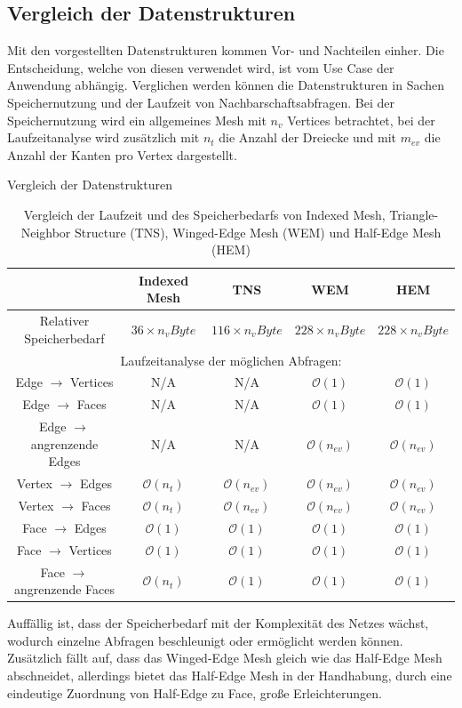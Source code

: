 \subsection{Vergleich der Datenstrukturen}
Mit den vorgestellten Datenstrukturen kommen Vor- und Nachteilen einher. Die Entscheidung, welche von diesen verwendet wird, ist vom Use Case der Anwendung abh\"angig. Verglichen werden k\"onnen die Datenstrukturen in Sachen Speichernutzung und der Laufzeit von Nachbarschaftsabfragen. Bei der Speichernutzung wird ein allgemeines Mesh mit $n_v$ Vertices betrachtet, bei der Laufzeitanalyse wird zus\"atzlich mit $n_t$ die Anzahl der Dreiecke und mit $m_{ev}$ die Anzahl der Kanten pro Vertex dargestellt.

\begin{table}[ht]
	\caption{Vergleich der Datenstrukturen}
	\centering
		\begin{tabular}{|c|c|c|c|c|}
			\hline \rowcolor{gray}
		& Indexed Mesh & TNS & WEM & HEM \\ 
		\hline 
		Relativer Speicherbedarf & $36 \times n_v Byte$ & $116 \times n_v Byte$ & $228 \times n_v Byte$ & $228 \times n_v  Byte$ \\ 
		\hline 
		\multicolumn{5}{|c|}{Laufzeitanalyse der m\"oglichen Abfragen:} \\ 
		\hline 
		Edge $\rightarrow$ Vertices & N/A  & N/A & $\mathcal{O}(1)$ & $\mathcal{O}(1)$  \\ 
		\hline 
		Edge $\rightarrow$ Faces & N/A & N/A & $\mathcal{O}(1)$ & $\mathcal{O}(1)$ \\ 
		\hline 
		Edge $\rightarrow$ angrenzende Edges & N/A & N/A & $\mathcal{O}(n_{ev})$ & $\mathcal{O}(n_{ev})$ \\ 
		\hline 
		Vertex $\rightarrow$ Edges & $\mathcal{O}(n_t)$ & $\mathcal{O}(n_{ev})$ & $\mathcal{O}(n_{ev})$ & $\mathcal{O}(n_{ev})$ \\ 
		\hline 
		Vertex $\rightarrow$ Faces & $\mathcal{O}(n_t)$ & $\mathcal{O}(n_{ev})$ & $\mathcal{O}(n_{ev})$ & $\mathcal{O}(n_{ev})$ \\ 
		\hline 
		Face $\rightarrow$ Edges & $\mathcal{O}(1)$ & $\mathcal{O}(1)$ & $\mathcal{O}(1)$ & $\mathcal{O}(1)$ \\ 
		\hline 
		Face $\rightarrow$ Vertices & $\mathcal{O}(1)$ & $\mathcal{O}(1)$ & $\mathcal{O}(1)$ & $\mathcal{O}(1)$ \\ 
		\hline 
		Face $\rightarrow$ angrenzende Faces & $\mathcal{O}(n_t)$ & $\mathcal{O}(1)$ & $\mathcal{O}(1)$ & $\mathcal{O}(1)$ \\ 
		\hline 
	\end{tabular} 
	\caption{\label{Table:Comp}Vergleich der Laufzeit und des Speicherbedarfs von Indexed Mesh, Triangle-Neighbor Structure (TNS), Winged-Edge Mesh (WEM) und Half-Edge Mesh (HEM)}
\end{table}
Auff\"allig ist, dass der Speicherbedarf mit der Komplexit\"at des Netzes w\"achst, wodurch einzelne Abfragen beschleunigt oder erm\"oglicht werden k\"onnen. Zus\"atzlich f\"allt auf, dass das Winged-Edge Mesh gleich wie das Half-Edge Mesh abschneidet, allerdings bietet das Half-Edge Mesh in der Handhabung, durch eine eindeutige Zuordnung von Half-Edge zu Face, gro{\ss}e Erleichterungen.

